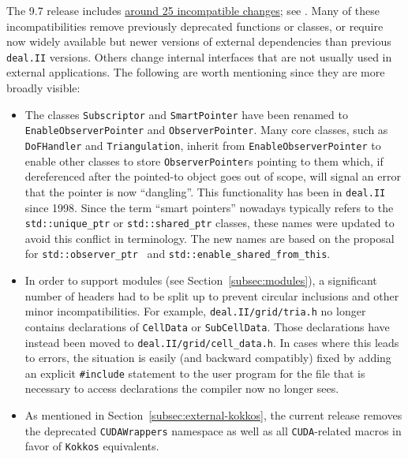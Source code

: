 \documentclass{ansarticle-preprint}
\newcommand{\specialword}[1]{\texttt{#1}}
\newcommand{\dealii}{{\specialword{deal.II}}\xspace}
\newcommand{\kokkos}{{\specialword{Kokkos}}\xspace}
\begin{document}
The 9.7 release includes
\href{https://dealii.org/developer/doxygen/deal.II/changes_between_9_6_0_and_9_7_0.html}
     {around 25 incompatible changes};
see \cite{changes97}. Many of these
incompatibilities remove previously deprecated functions or classes,
or require now widely available but newer versions of external
dependencies than previous \dealii{} versions. Others
change internal
interfaces that are not usually used in external
applications. The following are worth mentioning since they
are more broadly visible:
\begin{itemize}
  \item The classes \texttt{Subscriptor} and \texttt{SmartPointer} have been
    renamed to \texttt{EnableObserverPointer} and \texttt{ObserverPointer}. Many
    core classes, such as \texttt{DoFHandler} and \texttt{Triangulation},
    inherit from \texttt{EnableObserverPointer} to enable other classes to store
    \texttt{ObserverPointer}s pointing to them which, if dereferenced after the
    pointed-to object goes out of scope, will signal an error that the
    pointer is now ``dangling''. This
    functionality has been in \dealii since 1998. Since the term ``smart pointers''
    nowadays typically refers to the \texttt{std::unique\_ptr} or
    \texttt{std::shared\_ptr} classes, these
    names were updated to avoid this conflict in terminology. The new names are
    based on the proposal for \texttt{std::observer\_ptr}~\cite{Brown2014} and
    \texttt{std::enable\_shared\_from\_this}.

  \item In order to support modules (see Section~\ref{subsec:modules}), a
    significant number of headers had to be split up to prevent circular
    inclusions and other minor incompatibilities. For example,
    \texttt{deal.II/grid/tria.h} no longer contains declarations of \texttt{CellData} or
    \texttt{SubCellData}. Those declarations have instead been moved to
    \texttt{deal.II/grid/cell\_data.h}. In cases where this leads to errors,
    the situation is easily (and backward compatibly) fixed by adding an explicit
    \texttt{\#include} statement to the user program for the file that is necessary to
    access declarations the compiler now no longer sees.

  \item As mentioned in
    Section~\ref{subsec:external-kokkos}, the current release
    removes the deprecated \texttt{CUDAWrappers} namespace as well
    as all \texttt{CUDA}-related macros in favor of \kokkos
    equivalents.


\end{itemize}
\end{document}
